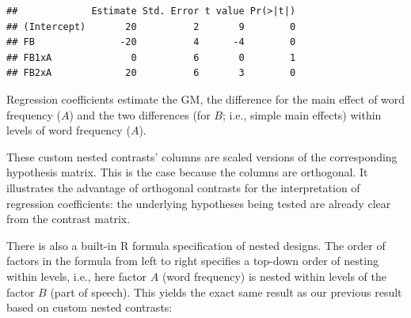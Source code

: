 \documentclass[12pt,]{krantz}
\newenvironment{Shaded}{\begin{snugshade}}{\end{snugshade}}
\newcommand{\DataTypeTok}[1]{\textcolor[rgb]{0.13,0.29,0.53}{#1}}
\newcommand{\DecValTok}[1]{\textcolor[rgb]{0.00,0.00,0.81}{#1}}
\newcommand{\FloatTok}[1]{\textcolor[rgb]{0.00,0.00,0.81}{#1}}
\newcommand{\KeywordTok}[1]{\textcolor[rgb]{0.13,0.29,0.53}{\textbf{#1}}}
\newcommand{\NormalTok}[1]{#1}
\newcommand{\OperatorTok}[1]{\textcolor[rgb]{0.81,0.36,0.00}{\textbf{#1}}}
\newcommand{\StringTok}[1]{\textcolor[rgb]{0.31,0.60,0.02}{#1}}
\begin{document}
\begin{Shaded}
\end{Shaded}

\begin{verbatim}
##             Estimate Std. Error t value Pr(>|t|)
## (Intercept)       20          2       9        0
## FB               -20          4      -4        0
## FB1xA              0          6       0        1
## FB2xA             20          6       3        0
\end{verbatim}

Regression coefficients estimate the GM, the difference for the main effect of word frequency (\(A\)) and the two differences (for \(B\); i.e., simple main effects) within levels of word frequency (\(A\)).

These custom nested contrasts' columns are scaled versions of the corresponding hypothesis matrix. This is the case because the columns are orthogonal. It illustrates the advantage of orthogonal contrasts for the interpretation of regression coefficients: the underlying hypotheses being tested are already clear from the contrast matrix.

There is also a built-in R formula specification of nested designs. The order of factors in the formula from left to right specifies a top-down order of nesting within levels, i.e., here factor \(A\) (word frequency) is nested within levels of the factor \(B\) (part of speech). This yields the exact same result as our previous result based on custom nested contrasts:

\begin{Shaded}
\end{Shaded}
\end{document}
